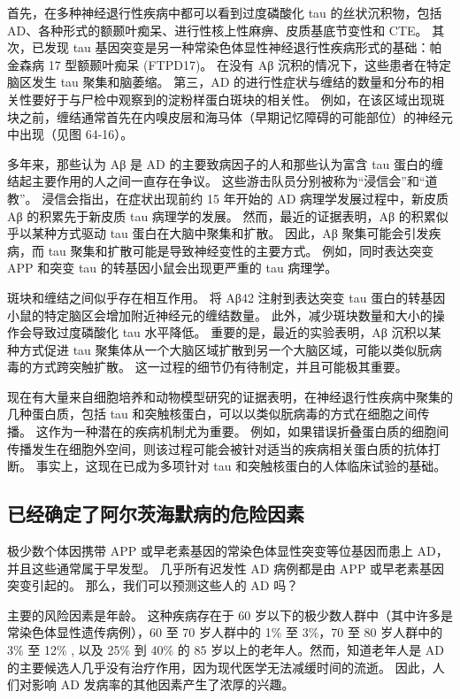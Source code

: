 首先，在多种神经退行性疾病中都可以看到过度磷酸化 tau 的丝状沉积物，包括 AD、各种形式的额颞叶痴呆、进行性核上性麻痹、皮质基底节变性和 CTE。 其次，已发现 tau 基因突变是另一种常染色体显性神经退行性疾病形式的基础：帕金森病 17 型额颞叶痴呆 (FTPD17)。 在没有 Aβ 沉积的情况下，这些患者在特定脑区发生 tau 聚集和脑萎缩。 第三，AD 的进行性症状与缠结的数量和分布的相关性要好于与尸检中观察到的淀粉样蛋白斑块的相关性。 例如，在该区域出现斑块之前，缠结通常首先在内嗅皮层和海马体（早期记忆障碍的可能部位）的神经元中出现（见图 64-16）。

多年来，那些认为 Aβ 是 AD 的主要致病因子的人和那些认为富含 tau 蛋白的缠结起主要作用的人之间一直存在争议。 这些游击队员分别被称为“浸信会”和“道教”。 浸信会指出，在症状出现前约 15 年开始的 AD 病理学发展过程中，新皮质 Aβ 的积累先于新皮质 tau 病理学的发展。 然而，最近的证据表明，Aβ 的积累似乎以某种方式驱动 tau 蛋白在大脑中聚集和扩散。 因此，Aβ 聚集可能会引发疾病，而 tau 聚集和扩散可能是导致神经变性的主要方式。 例如，同时表达突变 APP 和突变 tau 的转基因小鼠会出现更严重的 tau 病理学。

斑块和缠结之间似乎存在相互作用。 将 Aβ42 注射到表达突变 tau 蛋白的转基因小鼠的特定脑区会增加附近神经元的缠结数量。 此外，减少斑块数量和大小的操作会导致过度磷酸化 tau 水平降低。 重要的是，最近的实验表明，Aβ 沉积以某种方式促进 tau 聚集体从一个大脑区域扩散到另一个大脑区域，可能以类似朊病毒的方式跨突触扩散。 这一过程的细节仍有待制定，并且可能极其重要。

现在有大量来自细胞培养和动物模型研究的证据表明，在神经退行性疾病中聚集的几种蛋白质，包括 tau 和突触核蛋白，可以以类似朊病毒的方式在细胞之间传播。 这作为一种潜在的疾病机制尤为重要。 例如，如果错误折叠蛋白质的细胞间传播发生在细胞外空间，则该过程可能会被针对适当的疾病相关蛋白质的抗体打断。 事实上，这现在已成为多项针对 tau 和突触核蛋白的人体临床试验的基础。

\subsection{已经确定了阿尔茨海默病的危险因素}
极少数个体因携带 APP 或早老素基因的常染色体显性突变等位基因而患上 AD，并且这些通常属于早发型。 几乎所有迟发性 AD 病例都是由 APP 或早老素基因突变引起的。 那么，我们可以预测这些人的 AD 吗？

主要的风险因素是年龄。 这种疾病存在于 60 岁以下的极少数人群中（其中许多是常染色体显性遗传病例），60 至 70 岁人群中的 1\% 至 3\%，70 至 80 岁人群中的 3\% 至 12\% , 以及 25\% 到 40\% 的 85 岁以上的老年人。然而，知道老年人是 AD 的主要候选人几乎没有治疗作用，因为现代医学无法减缓时间的流逝。 因此，人们对影响 AD 发病率的其他因素产生了浓厚的兴趣。

